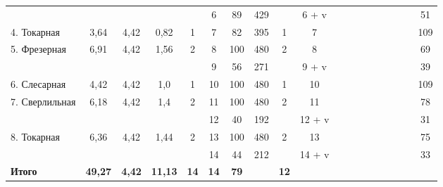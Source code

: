 \begin{landscape}
\begin{table} [h!]
{\begin{tabular}{
      | p{2.2cm} | c | c | c | c | c | c | c | c | c 
      | m{1cm} m{1cm} m{1cm} m{1cm} m{1cm} m{1cm} m{1cm} m{1cm} 
      | c |
      }
   & & & 
   & 
   & 6 
   & 89 & 429
   & 
   & 6 + v
   & & & & & & & &
   & 51 \\ \cline{1-10}\cline{19-19}

   4. Токарная
   & 3{,}64 & 4{,}42
   & 0{,}82 & 1
   & 7 
   & 82 & 395
   & 1
   & 7
   & & & & & & & &
   & 109 \\ \cline{1-10}\cline{19-19}

   \multirow{2}{*}{5. Фрезерная} 
   & \multirow{2}{*}{6{,}91} & \multirow{2}{*}{4{,}42}
   & \multirow{2}{*}{1{,}56} & \multirow{2}{*}{2}
   & 8 
   & 100 & 480
   & \multirow{2}{*}{2}
   & 8
   & & & & & & & &
   & 69 \\

   & & & 
   & 
   & 9 
   & 56 & 271
   & 
   & 9 + v
   & & & & & & & &
   & 39 \\ \cline{1-10}\cline{19-19}

   6. Слесарная
   & 4{,}42 & 4{,}42
   & 1{,}0 & 1
   & 10 
   & 100 & 480
   & 1
   & 10
   & & & & & & & &
   & 109 \\ \cline{1-10}\cline{19-19}

   \multirow{2}{*}{7. Сверлильная} 
   & \multirow{2}{*}{6{,}18} & \multirow{2}{*}{4{,}42}
   & \multirow{2}{*}{1{,}4} & \multirow{2}{*}{2}
   & 11 
   & 100 & 480
   & \multirow{2}{*}{2}
   & 11
   & & & & & & & &
   & 78 \\

   & & & 
   & 
   & 12 
   & 40 & 192
   & 
   & 12 + v
   & & & & & & & &
   & 31 \\ \cline{1-10}\cline{19-19}

   \multirow{2}{*}{8. Токарная} 
   & \multirow{2}{*}{6{,}36} & \multirow{2}{*}{4{,}42}
   & \multirow{2}{*}{1{,}44} & \multirow{2}{*}{2}
   & 13 
   & 100 & 480
   & \multirow{2}{*}{2}
   & 13
   & & & & & & & &
   & 75 \\

   & & & 
   & 
   & 14
   & 44 & 212
   & 
   & 14 + v
   & & & & & & & &
   & 33 \\ \cline{1-10}\cline{19-19}

   \raggedleft \textbf{Итого}
   & \textbf{49{,}27} & \textbf{4{,}42}
   & \textbf{11{,}13} & \textbf{14}
   & \textbf{14} 
   & \textbf{79} & 
   & \textbf{12}
   & 
   & & & & & & & &
   & \\ \hline

    \end{tabular}
  }
\end{table}


\end{landscape}
